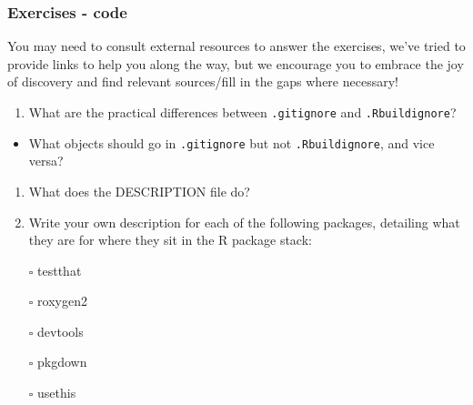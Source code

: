 \documentclass[
  letterpaper,
  DIV=11,
  numbers=noendperiod]{scrreprt}
\providecommand{\tightlist}{%
  \setlength{\itemsep}{0pt}\setlength{\parskip}{0pt}}\usepackage{longtable,booktabs,array}
\begin{document}
\subsubsection{Exercises - code}\label{exercises---code}

\begin{tcolorbox}[enhanced jigsaw, colback=white, opacitybacktitle=0.6, coltitle=black, left=2mm, breakable, bottomtitle=1mm, toptitle=1mm, toprule=.15mm, colframe=quarto-callout-warning-color-frame, titlerule=0mm, title=\textcolor{quarto-callout-warning-color}{\faExclamationTriangle}\hspace{0.5em}{Exercises}, colbacktitle=quarto-callout-warning-color!10!white, rightrule=.15mm, bottomrule=.15mm, arc=.35mm, opacityback=0, leftrule=.75mm]

You may need to consult external resources to answer the exercises,
we've tried to provide links to help you along the way, but we encourage
you to embrace the joy of discovery and find relevant sources/fill in
the gaps where necessary!

\end{tcolorbox}

\begin{enumerate}
\def\labelenumi{\arabic{enumi}.}
\tightlist
\item
  What are the practical differences between \texttt{.gitignore} and
  \texttt{.Rbuildignore}?
\end{enumerate}

\begin{itemize}
\tightlist
\item
  What objects should go in \texttt{.gitignore} but not
  \texttt{.Rbuildignore}, and vice versa?
\end{itemize}

\begin{enumerate}
\def\labelenumi{\arabic{enumi}.}
\setcounter{enumi}{1}
\tightlist
\item
  What does the DESCRIPTION file do?
\item
  Write your own description for each of the following packages,
  detailing what they are for where they sit in the R package stack:
\end{enumerate}

\begin{itemize}
\tightlist
\item[$\square$]
  testthat
\item[$\square$]
  roxygen2
\item[$\square$]
  devtools
\item[$\square$]
  pkgdown
\item[$\square$]
  usethis
\end{itemize}
\end{document}
